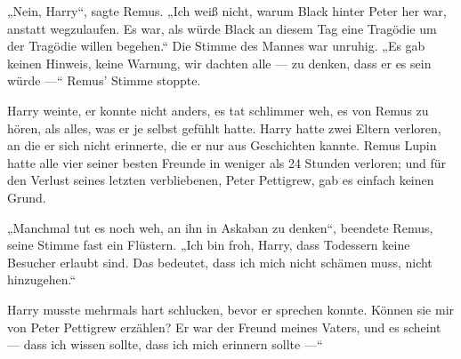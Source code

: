\later

„Nein, Harry“, sagte Remus.
„Ich weiß nicht, warum Black hinter Peter her war, anstatt wegzulaufen. Es war, als würde Black an diesem Tag eine Tragödie um der Tragödie willen begehen.“ Die Stimme des Mannes war unruhig.
„Es gab keinen Hinweis, keine Warnung, wir dachten alle — zu denken, dass er es sein würde —“ Remus’ Stimme stoppte.

Harry weinte, er konnte nicht anders, es tat schlimmer weh, es von Remus zu hören, als alles, was er je selbst gefühlt hatte. Harry hatte zwei Eltern verloren, an die er sich nicht erinnerte, die er nur aus Geschichten kannte. Remus Lupin hatte alle vier seiner besten Freunde in weniger als 24 Stunden verloren; und für den Verlust seines letzten verbliebenen, Peter Pettigrew, gab es einfach keinen Grund.

„Manchmal tut es noch weh, an ihn in Askaban zu denken“, beendete Remus, seine Stimme fast ein Flüstern.
„Ich bin froh, Harry, dass Todessern keine Besucher erlaubt sind. Das bedeutet, dass ich mich nicht schämen muss, nicht hinzugehen.“

Harry musste mehrmals hart schlucken, bevor er sprechen konnte.
Können sie mir von Peter Pettigrew erzählen? Er war der Freund meines Vaters, und es scheint — dass ich wissen sollte, dass ich mich erinnern sollte —“

